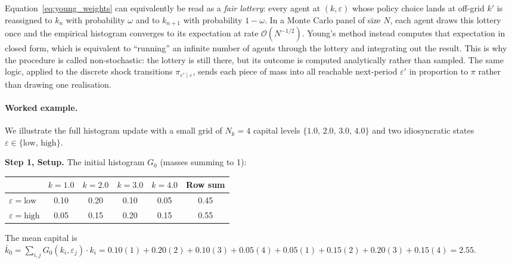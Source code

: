 \documentclass[11pt,a4paper]{report}
\begin{document}
\begin{remarkbox}
Equation~\eqref{eq:young_weights} can equivalently be read as a \emph{fair lottery}: every agent at $(k, \varepsilon)$ whose policy choice lands at off-grid $k'$ is reassigned to $k_n$ with probability $\omega$ and to $k_{n+1}$ with probability $1-\omega$.  In a Monte Carlo panel of size $N$, each agent draws this lottery once and the empirical histogram converges to its expectation at rate $\mathcal{O}(N^{-1/2})$.  Young's method instead computes that expectation in closed form, which is equivalent to ``running'' an infinite number of agents through the lottery and integrating out the result.  This is why the procedure is called non-stochastic: the lottery is still there, but its outcome is computed analytically rather than sampled.  The same logic, applied to the discrete shock transitions $\pi_{\varepsilon'\mid\varepsilon}$, sends each piece of mass into all reachable next-period $\varepsilon'$ in proportion to $\pi$ rather than drawing one realisation.
\end{remarkbox}

\paragraph{Worked example.}
We illustrate the full histogram update with a small grid of $N_k=4$ capital levels $\{1.0,\, 2.0,\, 3.0,\, 4.0\}$ and two idiosyncratic states $\varepsilon \in \{\text{low},\, \text{high}\}$.

\medskip\noindent
\textbf{Step 1, Setup.}  The initial histogram $G_0$ (masses summing to 1):
\begin{center}\small
\begin{tabular}{l cccc c}
\toprule
& $k=1.0$ & $k=2.0$ & $k=3.0$ & $k=4.0$ & Row sum \\
\midrule
$\varepsilon = \text{low}$  & 0.10 & 0.20 & 0.10 & 0.05 & 0.45 \\
$\varepsilon = \text{high}$ & 0.05 & 0.15 & 0.20 & 0.15 & 0.55 \\
\bottomrule
\end{tabular}
\end{center}
The mean capital is $\bar{k}_0 = \sum_{i,j} G_0(k_i,\varepsilon_j)\cdot k_i = 0.10(1) + 0.20(2) + 0.10(3) + 0.05(4) + 0.05(1) + 0.15(2) + 0.20(3) + 0.15(4) = 2.55$.
\end{document}
